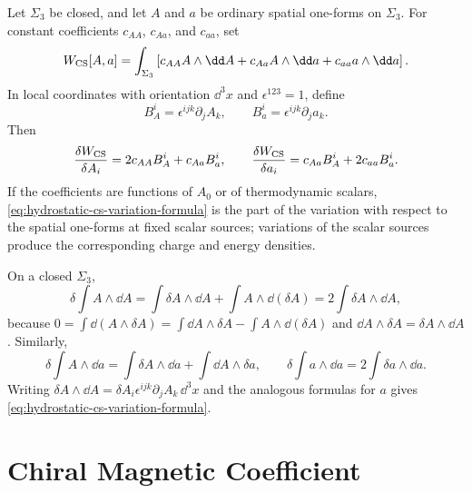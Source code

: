 \begin{remark}
\label{rem:hydrostatic-cs-variation}
Let \(\Sigma_3\) be closed, and let \(A\) and \(a\) be ordinary spatial
one-forms on \(\Sigma_3\).  For constant coefficients \(c_{AA}\), \(c_{Aa}\),
and \(c_{aa}\), set
\begin{equation}
  W_{\rm CS}[A,a]
  =
  \int_{\Sigma_3}
  \left[
    c_{AA} A\wedge\dd A
    +c_{Aa} A\wedge\dd a
    +c_{aa} a\wedge\dd a
  \right].
  \label{eq:hydrostatic-cs-functional-general}
\end{equation}
In local coordinates with orientation
\(\dd^3x\) and \(\epsilon^{123}=1\), define
\begin{equation}
  B_A^i=\epsilon^{ijk}\partial_j A_k,\qquad
  B_a^i=\epsilon^{ijk}\partial_j a_k .
  \label{eq:hydrostatic-magnetic-vectors}
\end{equation}
Then
\begin{equation}
  \frac{\delta W_{\rm CS}}{\delta A_i}
  =
  2c_{AA}B_A^i+c_{Aa}B_a^i,
  \qquad
  \frac{\delta W_{\rm CS}}{\delta a_i}
  =
  c_{Aa}B_A^i+2c_{aa}B_a^i .
  \label{eq:hydrostatic-cs-variation-formula}
\end{equation}
If the coefficients are functions of \(A_0\) or of thermodynamic scalars,
\eqref{eq:hydrostatic-cs-variation-formula} is the part of the variation
with respect to the spatial one-forms at fixed scalar sources; variations of
the scalar sources produce the corresponding charge and energy densities.

On a closed \(\Sigma_3\),
\[
  \delta\int A\wedge\dd A
  =
  \int\delta A\wedge\dd A+\int A\wedge\dd(\delta A)
  =
  2\int\delta A\wedge\dd A,
\]
because \(0=\int\dd(A\wedge\delta A)
=\int\dd A\wedge\delta A-\int A\wedge\dd(\delta A)\) and
\(\dd A\wedge\delta A=\delta A\wedge\dd A\).  Similarly,
\[
  \delta\int A\wedge\dd a
  =
  \int\delta A\wedge\dd a+\int \dd A\wedge\delta a,
  \qquad
  \delta\int a\wedge\dd a
  =
  2\int\delta a\wedge\dd a .
\]
Writing
\(\delta A\wedge\dd A=\delta A_i\epsilon^{ijk}\partial_jA_k\,\dd^3x\)
and the analogous formulas for \(a\) gives
\eqref{eq:hydrostatic-cs-variation-formula}.
\end{remark}

\section{Chiral Magnetic Coefficient}

